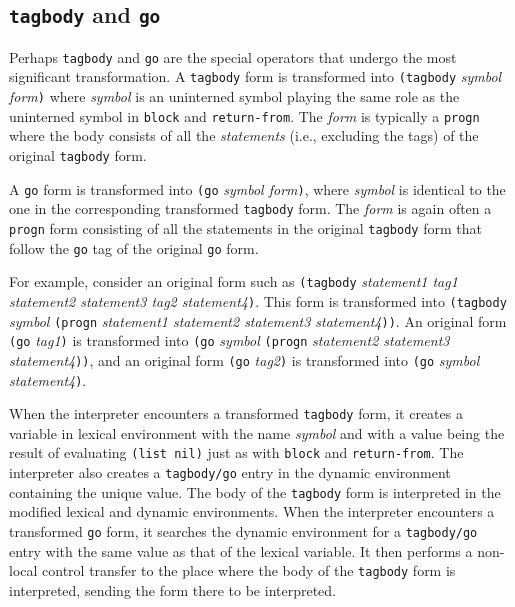 \subsection{\texttt{tagbody} and \texttt{go}}

Perhaps \texttt{tagbody} and \texttt{go} are the special operators
that undergo the most significant transformation.  A \texttt{tagbody}
form is transformed into \texttt{(tagbody} \textit{symbol
  form}\texttt{)} where \textit{symbol} is an uninterned symbol
playing the same role as the uninterned symbol in \texttt{block} and
\texttt{return-from}.  The \textit{form} is typically a \texttt{progn}
where the body consists of all the \emph{statements} (i.e., excluding
the tags) of the original \texttt{tagbody} form.

A \texttt{go} form is transformed into \texttt{(go} \textit{symbol
  form}\texttt{)}, where \textit{symbol} is identical to the one in
the corresponding transformed \texttt{tagbody} form.  The
\textit{form} is again often a \texttt{progn} form consisting of all
the statements in the original \texttt{tagbody} form that follow the
\texttt{go} tag of the original \texttt{go} form.

For example, consider an original form such as \texttt{(tagbody}
\textit{statement1 tag1 statement2 statement3 tag2
  statement4}\texttt{)}.  This form is transformed into
\texttt{(tagbody} \textit{symbol} \texttt{(progn} \textit{statement1
  statement2 statement3 statement4}\texttt{))}.  An original form
\texttt{(go} \textit{tag1}\texttt{)} is transformed into
\texttt{(go} \textit{symbol} \texttt{(progn} \textit{statement2
  statement3 statement4}\texttt{))}, and 
an original form
\texttt{(go} \textit{tag2}\texttt{)} is transformed into
\texttt{(go} \textit{symbol} \textit{statement4}\texttt{)}.

When the interpreter encounters a transformed \texttt{tagbody} form,
it creates a variable in lexical environment with the name
\textit{symbol} and with a value being the result of evaluating
\texttt{(list nil)} just as with \texttt{block} and
\texttt{return-from}.  The interpreter also creates a
\texttt{tagbody/go} entry in the dynamic environment containing the
unique value.  The body of the \texttt{tagbody} form is interpreted in
the modified lexical and dynamic environments.  When the interpreter
encounters a transformed \texttt{go} form, it searches the dynamic
environment for a \texttt{tagbody/go} entry with the same value as
that of the lexical variable.  It then performs a non-local control
transfer to the place where the body of the \texttt{tagbody} form is
interpreted, sending the form there to be interpreted.

